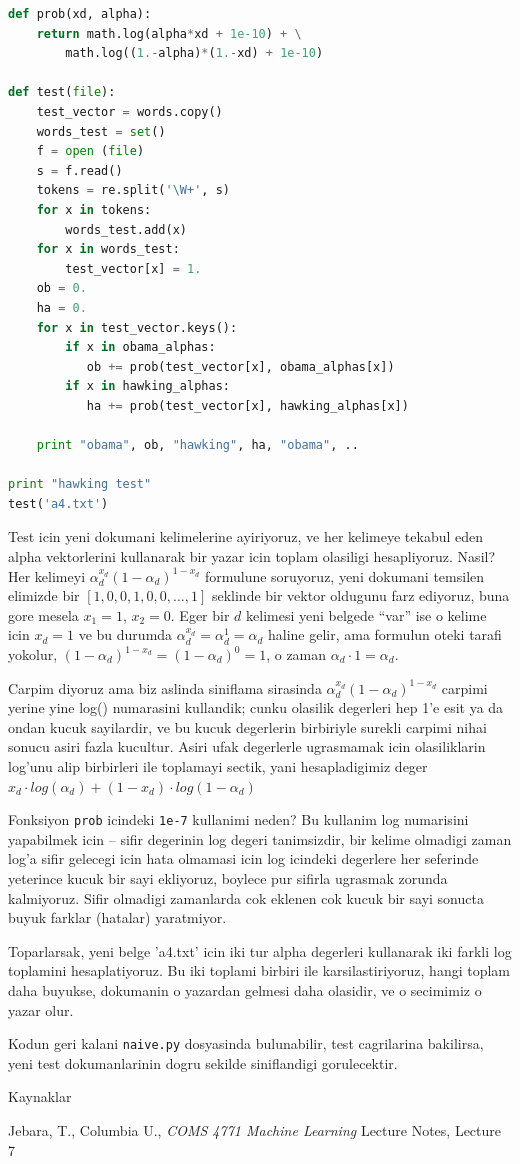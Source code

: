 \documentclass[12pt,fleqn]{article}
\begin{document}
\begin{lstlisting}[language=Python]
def prob(xd, alpha):
    return math.log(alpha*xd + 1e-10) + \
        math.log((1.-alpha)*(1.-xd) + 1e-10)
        
def test(file):
    test_vector = words.copy()   
    words_test = set()
    f = open (file)
    s = f.read()
    tokens = re.split('\W+', s)
    for x in tokens: 
        words_test.add(x)
    for x in words_test:  
        test_vector[x] = 1.
    ob = 0.
    ha = 0.
    for x in test_vector.keys(): 
        if x in obama_alphas: 
           ob += prob(test_vector[x], obama_alphas[x])
        if x in hawking_alphas: 
           ha += prob(test_vector[x], hawking_alphas[x])
                
    print "obama", ob, "hawking", ha, "obama", ..

print "hawking test"    
test('a4.txt')
\end{lstlisting}

Test icin yeni dokumani kelimelerine ayiriyoruz, ve her kelimeye tekabul eden
alpha vektorlerini kullanarak bir yazar icin toplam olasiligi
hesapliyoruz. Nasil? Her kelimeyi $\alpha_d^{x_d}(1-\alpha_d)^{1-x_d}$ formulune
soruyoruz, yeni dokumani temsilen elimizde bir $[1,0,0,1,0,0,...,1]$ seklinde
bir vektor oldugunu farz ediyoruz, buna gore mesela $x_1=1$, $x_2=0$. Eger bir
$d$ kelimesi yeni belgede ``var'' ise o kelime icin $x_d = 1$ ve bu durumda
$\alpha_d^{x_d} = \alpha_d^{1} = \alpha_d$ haline gelir, ama formulun oteki
tarafi yokolur, $(1-\alpha_d)^{1-x_d} = (1-\alpha_d)^0 = 1$, o zaman $\alpha_d
\cdot 1 = \alpha_d$.

Carpim diyoruz ama biz aslinda siniflama sirasinda
$\alpha_d^{x_d}(1-\alpha_d)^{1-x_d}$ carpimi yerine yine log() numarasini
kullandik; cunku olasilik degerleri hep 1'e esit ya da ondan kucuk sayilardir,
ve bu kucuk degerlerin birbiriyle surekli carpimi nihai sonucu asiri fazla
kucultur. Asiri ufak degerlerle ugrasmamak icin olasiliklarin log'unu alip
birbirleri ile toplamayi sectik, yani hesapladigimiz deger $x_d \cdot
log(\alpha_d) + (1-x_d) \cdot log(1-\alpha_d)$

Fonksiyon \verb!prob! icindeki \verb!1e-7! kullanimi neden? Bu kullanim log
numarisini yapabilmek icin -- sifir degerinin log degeri tanimsizdir, bir
kelime olmadigi zaman log'a sifir gelecegi icin hata olmamasi icin log icindeki 
degerlere her seferinde yeterince kucuk bir sayi ekliyoruz, boylece pur sifirla 
ugrasmak zorunda kalmiyoruz. Sifir olmadigi zamanlarda cok eklenen cok kucuk bir
sayi sonucta buyuk farklar (hatalar) yaratmiyor.

Toparlarsak, yeni belge 'a4.txt' icin iki tur alpha degerleri kullanarak iki
farkli log toplamini hesaplatiyoruz. Bu iki toplami birbiri ile karsilastiriyoruz,
hangi toplam daha buyukse, dokumanin o yazardan gelmesi daha olasidir, ve o
secimimiz o yazar olur.

Kodun geri kalani \verb!naive.py! dosyasinda bulunabilir, test cagrilarina
bakilirsa, yeni test dokumanlarinin dogru sekilde siniflandigi gorulecektir.



Kaynaklar

Jebara, T., Columbia U., {\em COMS 4771 Machine Learning} Lecture Notes, Lecture
7
\end{document}
